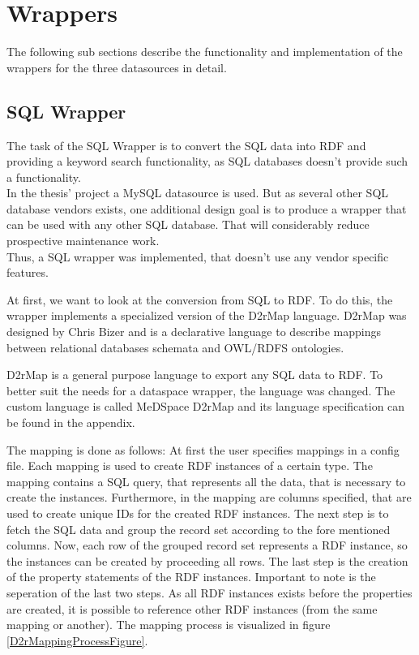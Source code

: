 \section{Wrappers}
The following sub sections describe the functionality and implementation of the wrappers for the three datasources in detail.


\subsection{SQL Wrapper}

The task of the SQL Wrapper is to convert the SQL data into RDF and providing a keyword search functionality, as SQL databases doesn't provide such a functionality. \\
In the thesis' project a MySQL datasource is used. But as several other SQL database vendors exists, one additional design goal is to produce a wrapper that can be used with any other SQL database. That will considerably reduce prospective maintenance work.\\
Thus, a SQL wrapper was implemented, that doesn't use any vendor specific features.

At first, we want to look at the conversion from SQL to RDF. To do this, the wrapper implements a specialized version of the D2rMap language. D2rMap was designed by Chris Bizer and is  a declarative language to describe mappings between relational databases schemata and OWL/RDFS ontologies\cite{D2rMap_aDatabaseToRdfMappingLanguage}.

D2rMap is a general purpose language to export any SQL data to RDF. To better suit the needs for a dataspace wrapper, the language was changed. The custom language is called MeDSpace D2rMap and its language specification can be found in the appendix.

The mapping is done as follows: At first the user specifies mappings in a config file. Each mapping is used to create RDF instances of a certain type. The mapping contains a SQL query, that represents all the data, that is necessary to create the instances. Furthermore, in the mapping are columns specified, that are used to create unique IDs for the created RDF instances.
The next step is to fetch the SQL data and group the record set according to the fore mentioned columns. Now, each row of the grouped record set represents a RDF instance, so the instances can be created by proceeding all rows. The last step is the creation of the property statements of the RDF instances. Important to note is the seperation of the last two steps. As all RDF instances exists before the properties are created, it is possible to reference other RDF instances (from the same mapping or another). The mapping process is visualized in figure \ref{D2rMappingProcessFigure}.

